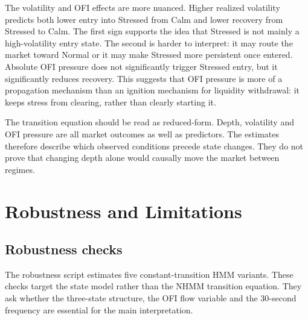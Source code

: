 \documentclass[12pt,a4paper]{article}
\begin{document}
The volatility and OFI effects are more nuanced. Higher realized volatility predicts both lower entry into Stressed from Calm and lower recovery from Stressed to Calm. The first sign supports the idea that Stressed is not mainly a high-volatility entry state. The second is harder to interpret: it may route the market toward Normal or it may make Stressed more persistent once entered. Absolute OFI pressure does not significantly trigger Stressed entry, but it significantly reduces recovery. This suggests that OFI pressure is more of a propagation mechanism than an ignition mechanism for liquidity withdrawal: it keeps stress from clearing, rather than clearly starting it.

The transition equation should be read as reduced-form. Depth, volatility  and OFI pressure are all market outcomes as well as predictors. The estimates therefore describe which observed conditions precede state changes. They do not prove that changing depth alone would causally move the market between regimes.

\section{Robustness and Limitations}\label{sec:robustness}

\subsection{Robustness checks}\label{sec:robustness_checks}

The robustness script estimates five constant-transition HMM variants. These checks target the state model rather than the NHMM transition equation. They ask whether the three-state structure, the OFI flow variable  and the 30-second frequency are essential for the main interpretation.
\end{document}
